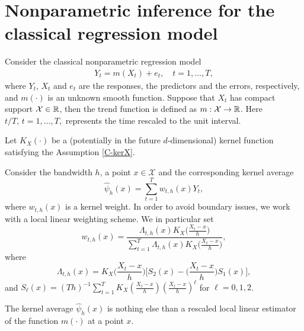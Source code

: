 \documentclass[a4paper,12pt]{article}
\begin{document}
\section{Nonparametric inference for the classical regression model}

Consider the classical nonparametric regression model
\begin{align}\label{model}
Y_t = m(X_t) + e_t, \quad t = 1,\ldots, T,
\end{align}
where $Y_t$, $X_t$ and $e_t$ are the responses, the predictors and the errors, respectively, and $m(\cdot)$ is an unknown smooth function. Suppose that $X_t$ has compact support $\mathcal{X}\in \mathbb{R}$, then the trend function is defined as $m: \mathcal{X} \rightarrow \mathbb{R}$. Here $t/T,\, t = 1,\ldots, T,$ represents the time rescaled to the unit interval.

Let $K_X(\cdot)$ be a (potentially in the future $d$-dimensional) kernel function satisfying the Assumption \ref{C-kerX}.

Consider the bandwidth $h$, a point $x \in \mathcal{X}$ and the corresponding kernel average
\begin{equation*}
\widehat{\psi}_{h}(x) = \sum\limits_{t=1}^T w_{t, h}(x)  Y_{t}, 
\end{equation*}
where $w_{t, h}(x)$ is a kernel weight. In order to avoid boundary issues, we work with a local linear weighting scheme. We in particular set 
\begin{equation}\label{weights}
w_{t, h}(x) = \frac{\Lambda_{t,h}(x)K_X\big(\frac{X_t-x}{h}\big) }{\sum\nolimits_{t=1}^T \Lambda_{t,h}(x) K_X\big(\frac{X_t-x}{h}\big)  }, 
\end{equation}
where
\[ \Lambda_{t,h}(x) = K_X\Big(\frac{X_t-x}{h}\Big) \bigg[ S_{2}(x) - \Big(\frac{X_t-x}{h}\Big) S_{1}(x) \bigg], \]
and $S_{\ell}(x) = (Th)^{-1} \sum\nolimits_{t=1}^T K_X(\frac{X_t-x}{h}) (\frac{X_t-x}{h})^\ell$ for $\ell = 0,1,2$.

The kernel average $\widehat{\psi}_{h}(x)$ is nothing else than a rescaled local linear estimator of the function $m(\cdot)$ at a point $x$.
\end{document}
